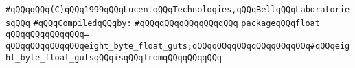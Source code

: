 \label{src/lib/std/float.pkg}
\verb|#qQQqqQQq(C)qQQq1999qQQqLucentqQQqTechnologies,qQQqBellqQQqLaboratoriesqQQq|\newline
\newline
\verb|#qQQqCompiledqQQqby:|\newline
\verb|#qQQqqQQqqQQqqQQqqQQq|\newline
\newline
\verb|packageqQQqfloat|\newline
\verb|qQQqqQQqqQQqqQQq=|\newline
\verb|qQQqqQQqqQQqqQQqeight_byte_float_guts;qQQqqQQqqQQqqQQqqQQqqQQq#qQQqeight_byte_float_gutsqQQqisqQQqfromqQQqqQQqqQQq|\newline
\newline

